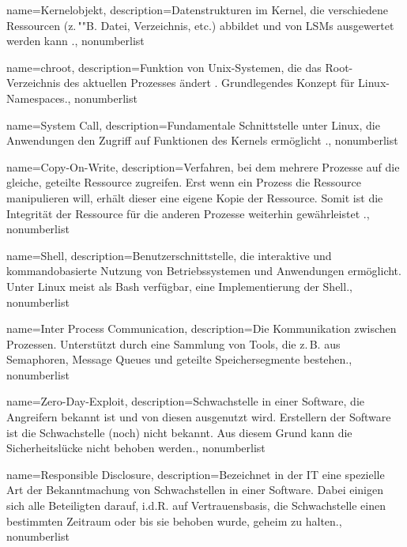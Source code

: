 {%
  name={Kernelobjekt},
  description={Datenstrukturen im Kernel, die verschiedene Ressourcen (z.\,""B. Datei, Verzeichnis, etc.) abbildet und von LSMs ausgewertet werden kann \cite{kernelObjects}.},
  nonumberlist
}

{%
  name={chroot},
  description={Funktion von Unix-Systemen, die das Root-Verzeichnis des aktuellen Prozesses ändert \cite{chroot}. Grundlegendes Konzept für Linux-Namespaces.},
  nonumberlist
}

{%
  name={System Call},
  description={Fundamentale Schnittstelle unter Linux, die Anwendungen den Zugriff auf Funktionen des Kernels ermöglicht \cite{systemcall}.},
  nonumberlist
}

{%
  name={Copy-On-Write},
  description={Verfahren, bei dem mehrere Prozesse auf die gleiche, geteilte Ressource zugreifen. Erst wenn ein Prozess die Ressource manipulieren will, erhält dieser eine eigene Kopie der Ressource. Somit ist die Integrität der Ressource für die anderen Prozesse weiterhin gewährleistet \cite{dockerImagesAndContainers}.},
  nonumberlist
}

{%
  name={Shell},
  description={Benutzerschnittstelle, die interaktive und kommandobasierte Nutzung von Betriebssystemen und Anwendungen ermöglicht. Unter Linux meist als Bash verfügbar, eine Implementierung der Shell.},
  nonumberlist
}

{%
  name={Inter Process Communication},
  description={Die Kommunikation zwischen Prozessen. Unterstützt durch eine Sammlung von Tools, die z.\,B. aus Semaphoren, Message Queues und geteilte Speichersegmente bestehen.},
  nonumberlist
}


{%
  name={Zero-Day-Exploit},
  description={Schwachstelle in einer Software, die Angreifern bekannt ist und von diesen ausgenutzt wird. Erstellern der Software ist die Schwachstelle (noch) nicht bekannt. Aus diesem Grund kann die Sicherheitslücke nicht behoben werden.},
  nonumberlist
}

{%
  name={Responsible Disclosure},
  description={Bezeichnet in der IT eine spezielle Art der Bekanntmachung von Schwachstellen in einer Software. Dabei einigen sich alle Beteiligten darauf, i.d.R. auf Vertrauensbasis, die Schwachstelle einen bestimmten Zeitraum oder bis sie behoben wurde, geheim zu halten.},
  nonumberlist
}


